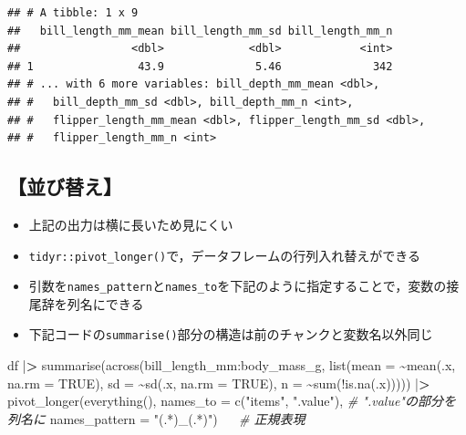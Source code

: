 \documentclass[
  xelatex,ja=standard, b5paper]{bxjsbook}
\newenvironment{Shaded}{\begin{snugshade}}{\end{snugshade}}
\newcommand{\AttributeTok}[1]{\textcolor[rgb]{0.77,0.63,0.00}{#1}}
\newcommand{\CommentTok}[1]{\textcolor[rgb]{0.56,0.35,0.01}{\textit{#1}}}
\newcommand{\ConstantTok}[1]{\textcolor[rgb]{0.00,0.00,0.00}{#1}}
\newcommand{\ErrorTok}[1]{\textcolor[rgb]{0.64,0.00,0.00}{\textbf{#1}}}
\newcommand{\FunctionTok}[1]{\textcolor[rgb]{0.00,0.00,0.00}{#1}}
\newcommand{\NormalTok}[1]{#1}
\newcommand{\SpecialCharTok}[1]{\textcolor[rgb]{0.00,0.00,0.00}{#1}}
\newcommand{\StringTok}[1]{\textcolor[rgb]{0.31,0.60,0.02}{#1}}
\providecommand{\tightlist}{%
  \setlength{\itemsep}{0pt}\setlength{\parskip}{0pt}}
\begin{document}
\begin{verbatim}
## # A tibble: 1 x 9
##   bill_length_mm_mean bill_length_mm_sd bill_length_mm_n
##                 <dbl>             <dbl>            <int>
## 1                43.9              5.46              342
## # ... with 6 more variables: bill_depth_mm_mean <dbl>,
## #   bill_depth_mm_sd <dbl>, bill_depth_mm_n <int>,
## #   flipper_length_mm_mean <dbl>, flipper_length_mm_sd <dbl>,
## #   flipper_length_mm_n <int>
\end{verbatim}

\hypertarget{su-st-reorder}{%
\subsection{【並び替え】}\label{su-st-reorder}}

\begin{itemize}
\tightlist
\item
  上記の出力は横に長いため見にくい
\item
  \texttt{tidyr::pivot\_longer()}で，データフレームの行列入れ替えができる
\item
  引数を\texttt{names\_pattern}と\texttt{names\_to}を下記のように指定することで，変数の接尾辞を列名にできる
\item
  下記コードの\texttt{summarise()}部分の構造は前のチャンクと変数名以外同じ
\end{itemize}

\begin{Shaded}
\begin{Highlighting}[]
\NormalTok{df }\SpecialCharTok{|}\ErrorTok{\textgreater{}} 
  \FunctionTok{summarise}\NormalTok{(}\FunctionTok{across}\NormalTok{(bill\_length\_mm}\SpecialCharTok{:}\NormalTok{body\_mass\_g,}
                   \FunctionTok{list}\NormalTok{(}\AttributeTok{mean =} \SpecialCharTok{\textasciitilde{}}\FunctionTok{mean}\NormalTok{(.x, }\AttributeTok{na.rm =} \ConstantTok{TRUE}\NormalTok{),}
                        \AttributeTok{sd =} \SpecialCharTok{\textasciitilde{}}\FunctionTok{sd}\NormalTok{(.x, }\AttributeTok{na.rm =} \ConstantTok{TRUE}\NormalTok{),}
                        \AttributeTok{n =} \SpecialCharTok{\textasciitilde{}}\FunctionTok{sum}\NormalTok{(}\SpecialCharTok{!}\FunctionTok{is.na}\NormalTok{(.x))))) }\SpecialCharTok{|}\ErrorTok{\textgreater{}} 
  \FunctionTok{pivot\_longer}\NormalTok{(}\FunctionTok{everything}\NormalTok{(),}
               \AttributeTok{names\_to =} \FunctionTok{c}\NormalTok{(}\StringTok{"items"}\NormalTok{, }\StringTok{".value"}\NormalTok{), }\CommentTok{\# ".value"の部分を列名に}
               \AttributeTok{names\_pattern =} \StringTok{"(.*)\_(.*)"}\NormalTok{) 　  }\CommentTok{\# 正規表現}
\end{Highlighting}
\end{Shaded}
\end{document}
